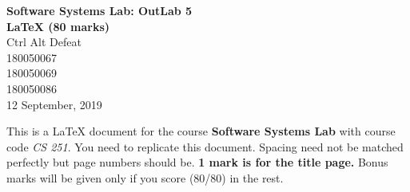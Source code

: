 \documentclass[12pt]{article}
\begin{document}
\begin{titlepage}
\begin{center}
\vspace*{72mm}
\textbf{\Huge{Software Systems Lab: OutLab 5}}\\[3mm]
\textbf{\Huge{\LaTeX{ }(80 marks)}}\\[1cm]
\LARGE{Ctrl Alt Defeat}\\[5mm]
\normalsize{180050067}\\[1mm]
\normalsize{180050069}\\[1mm]
\normalsize{180050086}\\[1cm]
\large{12 September, 2019}
\end{center}
\end{titlepage}
\tableofcontents
{}
\newpage
This is a \LaTeX{} document for the course \textbf{Software Systems Lab} with course\newline
code \textit{CS 251}. You need to replicate this document. Spacing need not be \newline
matched perfectly but page numbers should be. \textbf{1 mark is for the title page.}\newline
Bonus marks will be given only if you score (80/80) in the rest. 
\end{document}
